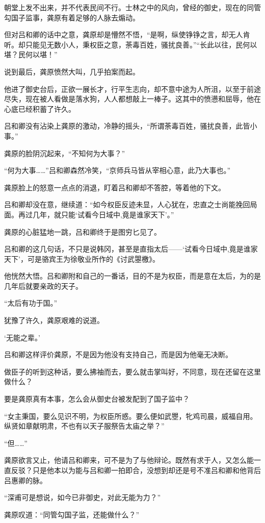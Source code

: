 朝堂上发不出来，并不代表民间不行。士林之中的风向，曾经的御史，现在的同管勾国子监事，龚原有着足够的人脉去煽动。

但对吕和卿的话中之意，龚原却是懵然不悟，“是啊，纵使铮铮之言，却无人肯听。却只能见无数小人，秉权臣之意，荼毒百姓，骚扰良善。”“长此以往，民何以堪？民何以堪！”

说到最后，龚原愤然大叫，几乎拍案而起。

他进了御史台后，正欲一展长才，行平生志向，却不意中途为人所沮，以至于前途尽失，现在被人看做是落水狗，人人都想敲上一棒子。这其中的愤懑和屈辱，他在心底已经积蓄了许久。

吕和卿没有沾染上龚原的激动，冷静的摇头，“所谓荼毒百姓，骚扰良善，此皆小事。”

龚原的脸阴沉起来，“不知何为大事？”

“何为大事……”吕和卿森然冷笑，“京师兵马皆从宰相心意，此乃大事也。”

龚原脸上的怒意一点点的消退，盯着吕和卿却不答腔，等着他的下文。

吕和卿却没在意，继续道：“如今权臣反迹未显，人心犹在，忠直之士尚能挽回局面。再过几年，就只能‘试看今日域中,竟是谁家天下’。”

龚原的心脏猛地一跳，吕和卿终于是图穷匕见了。

吕和卿的这几句话，不只是说韩冈，甚至是直指太后——‘试看今日域中,竟是谁家天下’，可是骆宾王为徐敬业所作的《讨武曌檄》。

他恍然大悟。吕和卿附和自己的一番话，目的不是为权臣，而是意在太后，为的是几年后就要亲政的天子。

“太后有功于国。”

犹豫了许久，龚原艰难的说道。

‘无能之辈。’

吕和卿这样评价龚原，不是因为他没有支持自己，而是因为他毫无决断。

做臣子的听到这种话，要么拂袖而去，要么就击掌叫好，不同意，现在还留在这里做什么？

要是龚原真有本事，怎么会从御史台被发配到了国子监中？

“女主秉国，要么见识不明，为权臣所惑。要么便如武瞾，牝鸡司晨，威福自用。纵贤如章献明肃，不也有以天子服祭告太庙之举？”

“但……”

龚原欲言又止，他请吕和卿来，可不是为了与他辩论。既然有求于人，又怎么能一直反驳？只是他本以为能与吕和卿一拍即合，没想到却还是号不准吕和卿和他背后吕惠卿的脉。

“深甫可是想说，如今已非御史，对此无能为力？”

龚原叹道：“同管勾国子监，还能做什么？”

